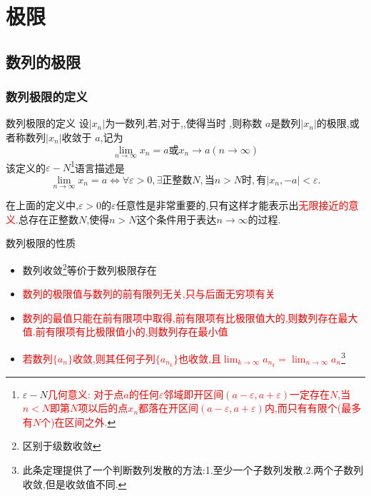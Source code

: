 \documentclass[8pt a4paper, oneside, UTF8]{ctexbook}
\begin{document}
\begin{sloppypar}
    \else
    \fi
    \chapter{极限}
    \section{数列的极限}
    \subsection{数列极限的定义}
    \begin{defn}{数列极限的定义}{}
        设$|x_n|$为一数列,若,对于,,使得当时 ,则称数 $a$是数列$| x_n |$的极限,或者称数列$| x_n |$收敛于 $a$,记为
        $$
            \lim_{n\to\infty}x_n=a\text{或}x_n\to a(n\to\infty)
        $$
        该定义的$\varepsilon-N$\footnote{$\varepsilon - N$\textcolor{red}{几何意义: 对于点$a$的任何$\varepsilon$邻域即开区间$(a-\varepsilon,a+\varepsilon)$一定存在$N$,当$n < N$即第$N$项以后的点$x_n$都落在开区间$(a-\varepsilon,a+\varepsilon)$内,而只有有限个(最多有$N$个)在区间之外.}}语言描述是
        $$\lim_{n\to\infty}x_n=a\Leftrightarrow\forall\varepsilon>0,\exists\text{正整数}N,\text{当}n>N\text{时},\text{有}|x_n,-a|<\varepsilon.$$
    \end{defn}
    在上面的定义中,$\varepsilon>0$的$\varepsilon$任意性是非常重要的,只有这样才能表示出\textcolor{red}{无限接近的意义}.总存在正整数$N$,使得$n>N$这个条件用于表达$n \to \infty$的过程.
    \begin{criterion}{数列极限的性质}{}
        \begin{itemize}
            \item 数列收敛\footnote{区别于级数收敛}等价于数列极限存在
            \item \textcolor{red}{数列的极限值与数列的前有限列无关,只与后面无穷项有关}
            \item \textcolor{red}{数列的最值只能在前有限项中取得,前有限项有比极限值大的,则数列存在最大值.前有限项有比极限值小的,则数列存在最小值}
            \item \textcolor{red}{若数列$\{a_n\}$收敛,则其任何子列$\{a_{n_k}\}$也收敛,且$\lim_{k\to\infty}a_{n_k}=\lim_{n\to\infty}a_n$}\footnote{ 此条定理提供了一个判断数列发散的方法:1.至少一个子数列发散.2.两个子数列收敛,但是收敛值不同.}

\end{itemize}
\end{criterion}
\end{sloppypar}
\end{document}
